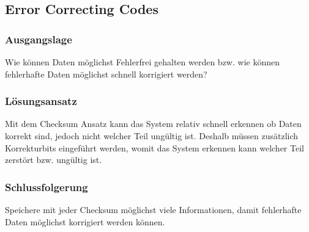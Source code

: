 \subsection{Error Correcting Codes}

\subsubsection*{Ausgangslage}

Wie können Daten möglichst Fehlerfrei gehalten werden bzw. wie können fehlerhafte Daten möglichst schnell korrigiert werden?

\subsubsection*{Lösungsansatz}

Mit dem Checksum Ansatz kann das System relativ schnell erkennen ob Daten korrekt sind, jedoch nicht welcher Teil ungültig ist. Deshalb müssen zusätzlich Korrekturbits eingeführt werden, womit das System erkennen kann welcher Teil zerstört bzw. ungültig ist.

\subsubsection*{Schlussfolgerung}

Speichere mit jeder Checksum möglichst viele Informationen, damit fehlerhafte Daten möglichst korrigiert werden können.

